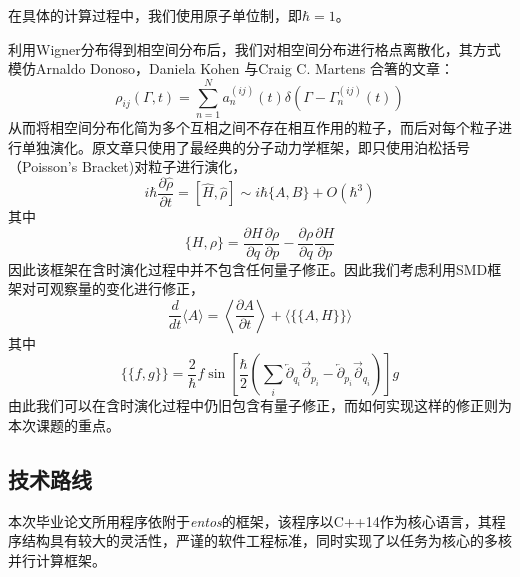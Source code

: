 在具体的计算过程中，我们使用原子单位制，即$\hbar = 1$。

利用Wigner分布得到相空间分布后，我们对相空间分布进行格点离散化，其方式模仿Arnaldo Donoso，Daniela Kohen 与Craig C. Martens 合箸的文章\cite{donoso2000simulation}：
\begin{equation}
\rho_{i j}(\Gamma, t)=\sum_{n=1}^{N} a_{n}^{(i j)}(t) \delta\left(\Gamma-\Gamma_{n}^{(i j)}(t)\right)
\end{equation} 
从而将相空间分布化简为多个互相之间不存在相互作用的粒子，而后对每个粒子进行单独演化。原文章只使用了最经典的分子动力学框架，即只使用泊松括号（Poisson's Bracket)对粒子进行演化，
\begin{equation}
	i \hbar \frac{\partial \hat{\rho}}{\partial t}=[\hat{H}, \hat{\rho}] \sim i \hbar\{A, B\}+O\left(\hbar^{3}\right)
\end{equation}
其中
\begin{equation}
	\{H, \rho\}=\frac{\partial H}{\partial q} \frac{\partial \rho}{\partial p}-\frac{\partial \rho}{\partial q} \frac{\partial H}{\partial p}
\end{equation}
因此该框架在含时演化过程中并不包含任何量子修正。因此我们考虑利用SMD框架对可观察量的变化进行修正，
\begin{equation}
	\frac{d}{d t}\langle A\rangle=\left\langle\frac{\partial A}{\partial t}\right\rangle+\langle\{\{A, H\}\}\rangle
	\label{Ehrenfest_in_proposal}
\end{equation}
其中
 \begin{equation}
	 \{\{f, g\}\}=\frac{2}{\hbar} f \sin \left[\frac{\hbar}{2}\left(\sum_{i} \overleftarrow{\partial}_{q_{i}} \overrightarrow{\partial}_{p_{i}}-\overleftarrow{\partial}_{p_{i}} \overrightarrow{\partial}_{q_{i}}\right)\right] g
\end{equation}
由此我们可以在含时演化过程中仍旧包含有量子修正，而如何实现这样的修正则为本次课题的重点。

\subsection{技术路线}
本次毕业论文所用程序依附于\emph{entos}的框架，该程序以C++14作为核心语言，其程序结构具有较大的灵活性，严谨的软件工程标准，同时实现了以任务为核心的多核并行计算框架\cite{Manby2019}。

